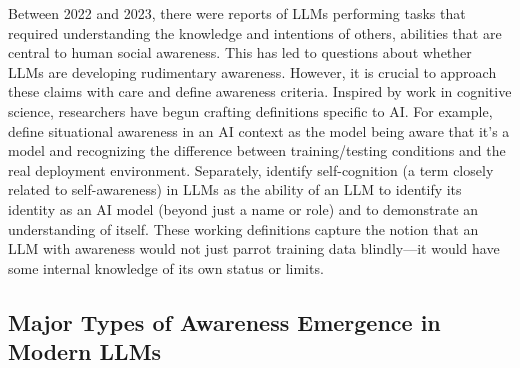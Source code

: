 Between 2022 and 2023, there were reports of LLMs performing tasks that required understanding the knowledge and intentions of others, abilities that are central to human social awareness. This has led to questions about whether LLMs are developing rudimentary awareness. However, it is crucial to approach these claims with care and define awareness criteria. Inspired by work in cognitive science, researchers have begun crafting definitions specific to AI. For example, \citet{berglund2023situational} define situational awareness in an AI context as the model being aware that it's a model and recognizing the difference between training/testing conditions and the real deployment environment. Separately, \citet{chen2024imitation} identify self-cognition (a term closely related to self-awareness) in LLMs as the ability of an LLM to identify its identity as an AI model (beyond just a name or role) and to demonstrate an understanding of itself. These working definitions capture the notion that an LLM with awareness would not just parrot training data blindly—it would have some internal knowledge of its own status or limits. 

\subsection{Major Types of Awareness Emergence in Modern LLMs} %

